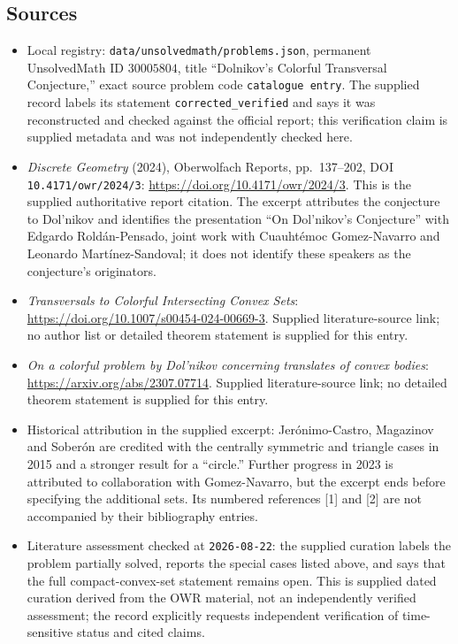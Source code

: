 \documentclass[11pt]{article}
\begin{document}
\subsection{Sources}
\begin{itemize}
\item Local registry: \texttt{data/unsolvedmath/problems.json}, permanent UnsolvedMath ID \(30005804\), title ``Dolnikov's Colorful Transversal Conjecture,'' exact source problem code \texttt{catalogue entry}. The supplied record labels its statement \texttt{corrected\_verified} and says it was reconstructed and checked against the official report; this verification claim is supplied metadata and was not independently checked here.
\item \emph{Discrete Geometry} (2024), Oberwolfach Reports, pp.\ 137--202, DOI \texttt{10.4171/owr/2024/3}: \url{https://doi.org/10.4171/owr/2024/3}. This is the supplied authoritative report citation. The excerpt attributes the conjecture to Dol'nikov and identifies the presentation ``On Dol'nikov's Conjecture'' with Edgardo Rold\'an-Pensado, joint work with Cuauht\'emoc Gomez-Navarro and Leonardo Mart\'inez-Sandoval; it does not identify these speakers as the conjecture's originators.
\item \emph{Transversals to Colorful Intersecting Convex Sets}: \url{https://doi.org/10.1007/s00454-024-00669-3}. Supplied literature-source link; no author list or detailed theorem statement is supplied for this entry.
\item \emph{On a colorful problem by Dol'nikov concerning translates of convex bodies}: \url{https://arxiv.org/abs/2307.07714}. Supplied literature-source link; no detailed theorem statement is supplied for this entry.
\item Historical attribution in the supplied excerpt: Jer\'onimo-Castro, Magazinov and Sober\'on are credited with the centrally symmetric and triangle cases in 2015 and a stronger result for a ``circle.'' Further progress in 2023 is attributed to collaboration with Gomez-Navarro, but the excerpt ends before specifying the additional sets. Its numbered references [1] and [2] are not accompanied by their bibliography entries.
\item Literature assessment checked at \texttt{2026-08-22}: the supplied curation labels the problem partially solved, reports the special cases listed above, and says that the full compact-convex-set statement remains open. This is supplied dated curation derived from the OWR material, not an independently verified assessment; the record explicitly requests independent verification of time-sensitive status and cited claims.
\end{itemize}
\end{document}
